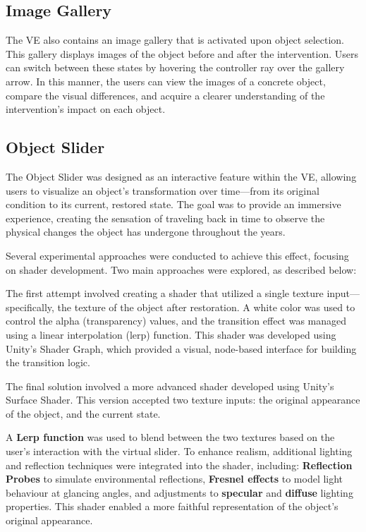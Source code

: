 \subsection*{Image Gallery}
The VE also contains an image gallery that is activated upon object selection. This gallery displays images of the object before and after the intervention. Users can switch between these states by hovering the controller ray over the gallery arrow. In this manner, the users can view the images of a concrete object, compare the visual differences, and acquire a clearer understanding of the intervention's impact on each object.

\subsection*{Object Slider}

The Object Slider was designed as an interactive feature within the VE, allowing users to visualize an object's transformation over time—from its original condition to its current, restored state. The goal was to provide an immersive experience, creating the sensation of traveling back in time to observe the physical changes the object has undergone throughout the years.

Several experimental approaches were conducted to achieve this effect, focusing on shader development.
Two main approaches were explored, as described below:

The first attempt involved creating a shader that utilized a single texture input—specifically, the texture of the object after restoration. A white color was used to control the alpha (transparency) values, and the transition effect was managed using a linear interpolation (lerp) function. This shader was developed using Unity’s Shader Graph, which provided a visual, node-based interface for building the transition logic.

The final solution involved a more advanced shader developed using Unity’s Surface Shader. This version accepted two texture inputs:
the original appearance of the object, and the current state.

A \textbf{Lerp function} was used to blend between the two textures based on the user's interaction with the virtual slider. To enhance realism, additional lighting and reflection techniques were integrated into the shader, including:
\textbf{Reflection Probes} to simulate environmental reflections, \textbf{Fresnel effects} to model light behaviour at glancing angles, and adjustments to \textbf{specular} and  \textbf{diffuse} lighting properties. This shader enabled a more faithful representation of the object's original appearance.


